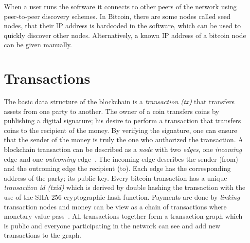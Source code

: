 When a user runs the software it connects to other peers of the network using peer-to-peer discovery schemes. In Bitcoin, there are some nodes called seed nodes, that their IP address is hardcoded in the software, which can be used to quickly discover other nodes. Alternatively, a known IP address of a bitcoin node can be given manually.

\section{Transactions}\label{blockchain:structure:tx}

The basic data structure of the blockchain is a \textit{transaction (tx)} that transfers assets from one party to another. The owner of a coin transfers coins by publishing a digital signature; his desire to perform a transaction that transfers coins to the recipient of the money. By verifying the signature, one can ensure that the sender of the money is truly the one who authorized the transaction. A blockchain transaction can be described as a \textit{node} with two \textit{edges}, one \textit{incoming} edge and one \textit{outcoming} edge~\cite{zindros_thesis}. The incoming edge describes the sender (from) and the outcoming edge the recipient (to). Each edge has the corresponding address of the party; its public key. Every bitcoin transaction has a unique \textit{transaction id (txid)} which is derived by double hashing the transaction with the use of the SHA-256 cryptographic hash function. Payments are done by \textit{linking} transaction nodes and money can be view as a chain of transactions where monetary value pass~\cite{zindros_thesis}. All transactions together form a transaction graph which is public and everyone participating in the network can see and add new transactions to the graph.


